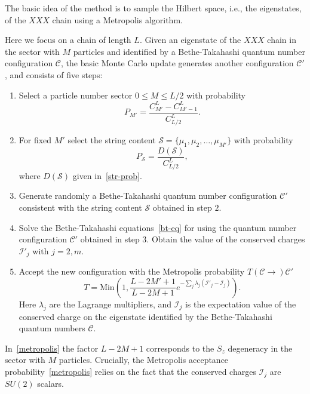 \documentclass[twocolumn,superscriptaddress,prb,10pt]{revtex4-1}
\begin{document}
The basic idea of the method is to sample the Hilbert space, i.e., the eigenstates,
 of the $XXX$ chain using a Metropolis algorithm. 

Here we focus on a chain of length $L$. Given an eigenstate of the $XXX$ chain 
in the sector with $M$ particles and identified by a Bethe-Takahashi quantum number 
configuration ${\mathcal C}$, the basic Monte Carlo update generates another 
configuration ${\mathcal C}'$, and consists of five steps:
%
\begin{enumerate}
%
\item Select a particle number sector $0\le M\le L/2$ with probability 
%
\begin{equation}
P_{M'}=\frac{C^{L}_{M'}-C^L_{M'-1}}{C^{L}_{L/2}}.
\end{equation}
%
\item For fixed $M'$ select the string content ${\mathcal S}=\{\mu_1,\mu_2,\dots,
\mu_{M'}\}$ with probability
%
\begin{equation}
P_{\mathcal S}=\frac{D({\mathcal S})}{C^L_{L/2}},
\end{equation}
%
where $D({\mathcal S})$ given in~\eqref{str-prob}.
\item Generate randomly a Bethe-Takahashi quantum number configuration ${\mathcal C'}$ 
consistent with the string content ${\mathcal S}$ obtained in step $2$.
\item Solve the Bethe-Takahashi equations~\eqref{bt-eq} for using the quantum number 
configuration ${\mathcal C}'$ obtained in step $3$. Obtain the value of the conserved 
charges ${\mathcal I}'_j$ with $j=2,m$.
\item Accept the new configuration with the Metropolis probability $T({\mathcal C}
\rightarrow){\mathcal C}'$ 
%
\begin{equation}
\label{metropolis}
T=
\textrm{Min}\left(1,\frac{L-2M'+1}{L-2M+1}e^{-\sum_j\lambda_j({\mathcal I}'_j-{\mathcal 
I}^{}_j)}\right).
\end{equation}
Here $\lambda_j$ are the Lagrange multipliers, and ${\mathcal I}_j$ is the expectation 
value of the conserved charge on the eigenstate identified by the Bethe-Takahashi quantum 
numbers ${\mathcal C}$. 
\end{enumerate}
%
In~\eqref{metropolis} the factor $L-2M+1$ corresponds to the $S_z$ degeneracy in the 
sector with $M$ particles. Crucially, the Metropolis acceptance probability~\eqref{metropolis} 
relies on the fact that the conserved charges ${\mathcal I}_j$ are $SU(2)$ scalars. 
\end{document}
